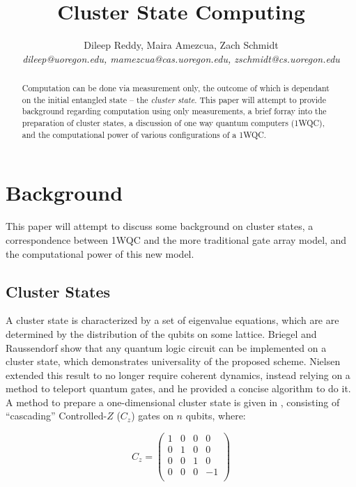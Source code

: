 \documentclass[twocolumn]{IEEEtran11}
\begin{document}


\title{\Large \bf Cluster State Computing}
\author{
Dileep Reddy, Maira Amezcua, Zach Schmidt \\
{\em dileep@uoregon.edu, mamezcua@cas.uoregon.edu, zschmidt@cs.uoregon.edu }
}
\maketitle

\begin{abstract}
Computation can be done via measurement only, the outcome of which is dependant on the initial entangled state -- the \textit{cluster state}. This paper will attempt to provide background regarding computation using only measurements, a brief forray into the preparation of cluster states, a discussion of one way quantum computers (1WQC), and the computational power of various configurations of a 1WQC.
\end{abstract}


\section{Background}
This paper will attempt to discuss some background on cluster states, a correspondence between 1WQC and the more traditional gate array model, and the computational power of this new model.

\subsection{Cluster States}
A cluster state is characterized by a set of eigenvalue equations, which are are determined by the distribution of the qubits on some lattice\cite{briegel2001persistent}.
Briegel and Raussendorf show that any quantum logic circuit can be implemented on a cluster state, which demonstrates universality of the proposed scheme\cite{briegel2000measurements}. Nielsen\cite{nielsen108020universal} extended this result to no longer require coherent dynamics, instead relying on a method to teleport quantum gates, and he provided a concise algorithm to do it. A method to prepare a one-dimensional cluster state is given in \cite{jorrand2005unifying}, consisting of ``cascading'' Controlled-$Z$ ($C_z$) gates on $n$ qubits, where:

\[
C_z = 
\begin{pmatrix}
  1 & 0 & 0 & 0 \\
  0 & 1 & 0 & 0 \\
  0 & 0 & 1 & 0 \\
  0 & 0 & 0 & -1 \\
 \end{pmatrix}
\]
\end{document}
